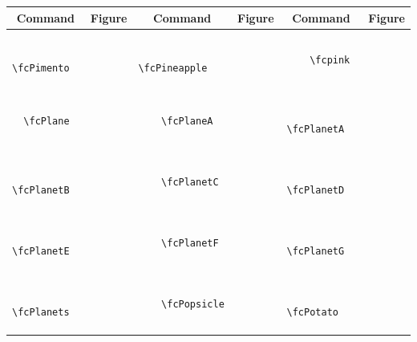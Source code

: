 \documentclass[x11names]{article}
\begin{document}
\begin{table}[H]\centering\begin{tabular}{|c|c|c|c|c|c|}\hline{\bf Command} & {\bf Figure} & {\bf Command} & {\bf Figure} & {\bf Command} & {\bf Figure}\\	\hline	&\multirow{5}{*}{	\fcPimento	[scale=0.16]} & &\multirow{5}{*}{	\fcPineapple	[scale=0.64]} & &\multirow{5}{*}{	\fcpink	[scale=0.16]}\\	& & & & & \\	& & & & & \\	\verb|	\fcPimento	| & & \verb|	\fcPineapple	| & & \verb|	\fcpink	| & \\	& & & & & \\	& & & & & \\	& & & & & \\	\hline									
		&\multirow{5}{*}{	\fcPlane	[scale=0.64]} & &\multirow{5}{*}{	\fcPlaneA	[scale=0.64]} & &\multirow{5}{*}{	\fcPlanetA	[scale=0.16]}\\	& & & & & \\	& & & & & \\	\verb|	\fcPlane	| & & \verb|	\fcPlaneA	| & & \verb|	\fcPlanetA	| & \\	& & & & & \\	& & & & & \\	& & & & & \\	\hline									
		&\multirow{5}{*}{	\fcPlanetB	[scale=0.16]} & &\multirow{5}{*}{	\fcPlanetC	[scale=0.16]} & &\multirow{5}{*}{	\fcPlanetD	[scale=0.16]}\\	& & & & & \\	& & & & & \\	\verb|	\fcPlanetB	| & & \verb|	\fcPlanetC	| & & \verb|	\fcPlanetD	| & \\	& & & & & \\	& & & & & \\	& & & & & \\	\hline									
		&\multirow{5}{*}{	\fcPlanetE	[scale=0.16]} & &\multirow{5}{*}{	\fcPlanetF	[scale=0.16]} & &\multirow{5}{*}{	\fcPlanetG	[scale=0.16]}\\	& & & & & \\	& & & & & \\	\verb|	\fcPlanetE	| & & \verb|	\fcPlanetF	| & & \verb|	\fcPlanetG	| & \\	& & & & & \\	& & & & & \\	& & & & & \\	\hline									
		&\multirow{5}{*}{	\fcPlanets	[scale=0.16]} & &\multirow{5}{*}{	\fcPopsicle	[scale=0.16]} & &\multirow{5}{*}{	\fcPotato	[scale=0.16]}\\	& & & & & \\	& & & & & \\	\verb|	\fcPlanets	| & & \verb|	\fcPopsicle	| & & \verb|	\fcPotato	| & \\	& & & & & \\	& & & & & \\	& & & & & \\	\hline									

\end{tabular}
\end{table}
\end{document}
